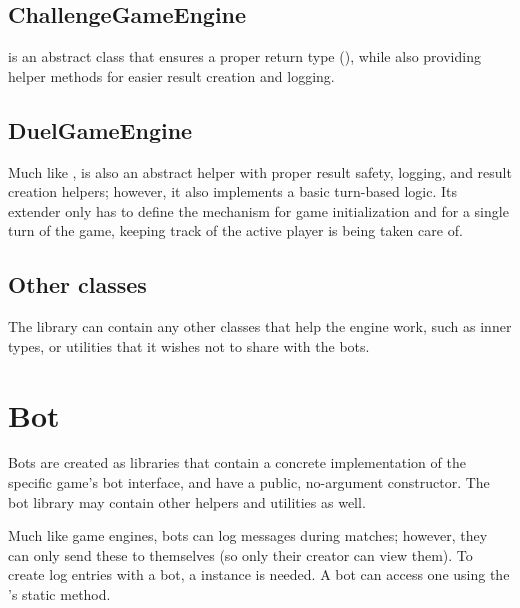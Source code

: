 		\subsection*{ChallengeGameEngine}
		
		 is an abstract class that ensures a proper return type (), while also providing helper methods for easier result creation and logging.
		
		\subsection*{DuelGameEngine}
		
		Much like ,  is also an abstract helper with proper result safety, logging, and result creation helpers; however, it also implements a basic turn-based logic. Its extender only has to define the mechanism for game initialization and for a single turn of the game, keeping track of the active player is being taken care of.
		
		\subsection*{Other classes}
		
		The library can contain any other classes that help the engine work, such as inner types, or utilities that it wishes not to share with the bots.

	\section{Bot}
	
	Bots are created as libraries that contain a concrete implementation of the specific game's bot interface, and have a public, no-argument constructor. The bot library may contain other helpers and utilities as well.

	Much like game engines, bots can log messages during matches; however, they can only send these to themselves (so only their creator can view them). To create log entries with a bot, a  instance is needed. A bot can access one using the 's static  method.
	
